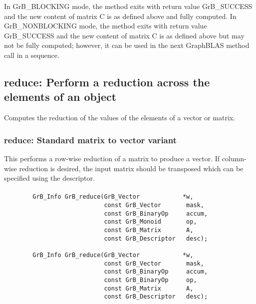 In {\sf GrB\_BLOCKING} mode, the method exits with return value 
{\sf GrB\_SUCCESS} and the new content of matrix {\sf C} is as defined above
and fully computed.  
In {\sf GrB\_NONBLOCKING} mode, the method exits with return value 
{\sf GrB\_SUCCESS} and the new content of matrix {\sf C} is as defined above 
but may not be fully computed; however, it can be used in the next GraphBLAS 
method call in a sequence.


\subsection{{\sf reduce}: Perform a reduction across the elements of an object}

Computes the reduction of the values of the elements of a vector or matrix.

\subsubsection{{\sf reduce}: Standard matrix to vector variant}

This performs a row-wise reduction of a matrix to produce a vector.  If column-wise reduction
is desired, the input matrix should be transposed which can be specified using the descriptor.

\paragraph{\syntax}

\begin{verbatim}
        GrB_Info GrB_reduce(GrB_Vector            *w,
                            const GrB_Vector       mask,
                            const GrB_BinaryOp     accum,
                            const GrB_Monoid       op,  
                            const GrB_Matrix       A,
                            const GrB_Descriptor   desc);
                            
        GrB_Info GrB_reduce(GrB_Vector            *w,
                            const GrB_Vector       mask,
                            const GrB_BinaryOp     accum,
                            const GrB_BinaryOp     op,  
                            const GrB_Matrix       A,
                            const GrB_Descriptor   desc);
\end{verbatim}

